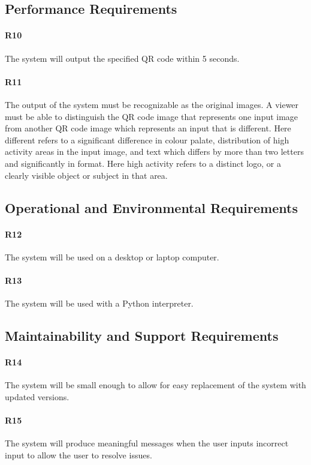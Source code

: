 \documentclass[12pt, titlepage]{article}
\begin{document}
\subsection{Performance Requirements}

	\paragraph{R10}
	The system will output the specified QR code within 5 seconds.
	\paragraph{R11}
	The output of the system must be recognizable as the original images. A 
	viewer must be able to distinguish the QR code image that represents one 
	input image from another QR code image which represents an input that is 
	different. Here	different refers to a significant difference in colour 
	palate, distribution of high activity areas in the input image, and text 
	which differs by more than two letters and significantly in format. Here 
	high activity refers to	a distinct logo, or a clearly visible object or 
	subject in that area.

\subsection{Operational and Environmental Requirements}
	
	\paragraph{R12}
	The system will be used on a desktop or laptop computer.
	\paragraph{R13}
	The system will be used with a Python interpreter.
	
\subsection{Maintainability and Support Requirements}

	\paragraph{R14}
	The system will be small enough to allow for easy replacement of the system 
	with updated versions.
	\paragraph{R15}
	The system will produce meaningful messages when the user inputs incorrect 
	input to allow the user to resolve issues.
\end{document}
